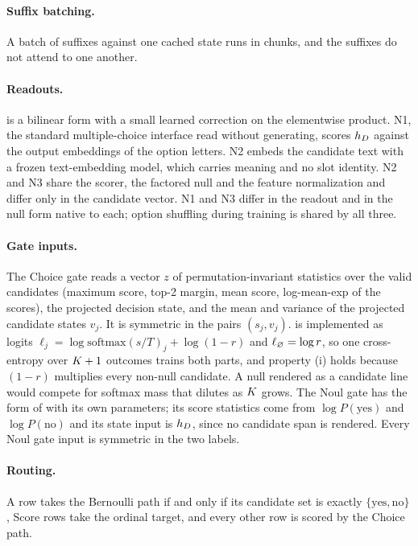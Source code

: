 \paragraph{Suffix batching.} A batch of suffixes against one cached state runs in chunks, and the suffixes
do not attend to one another.

\paragraph{Readouts.}  is a bilinear form with a small learned correction on the
elementwise product. N1, the standard multiple-choice interface read without generating, scores $h_D$
against the output embeddings of the option letters. N2 embeds the candidate text with a frozen
text-embedding model, which carries meaning and no slot identity. N2 and N3 share the scorer, the
factored null and the feature normalization and differ only in the candidate vector. N1 and N3 differ in
the readout and in the null form native to each; option shuffling during training is shared by all three.

\paragraph{Gate inputs.} The Choice gate reads a vector $z$ of permutation-invariant statistics over the
valid candidates (maximum score, top-2 margin, mean score, log-mean-exp of the scores), the projected
decision state, and the mean and variance of the projected candidate states $v_j$. It is symmetric in the
pairs $(s_j, v_j)$.  is implemented as logits $\ell_j = \log
\mathrm{softmax}(s/T)_j + \log(1-r)$ and $\ell_\varnothing = \log r$, so one cross-entropy over
$K + 1$ outcomes trains both parts, and property (i) holds because $(1-r)$ multiplies every
non-null candidate. A null rendered as a candidate line would compete for softmax mass that dilutes as
$K$ grows. The Noul gate has the form of  with its own parameters; its
score statistics come from $\log P(\text{yes})$ and $\log P(\text{no})$ and its state input is $h_D$,
since no candidate span is rendered. Every Noul gate input is symmetric in the two labels.

\paragraph{Routing.} A row takes the Bernoulli path if and only if its candidate set is exactly
$\{\text{yes}, \text{no}\}$, Score rows take the ordinal target, and every other row is scored by the
Choice path.

